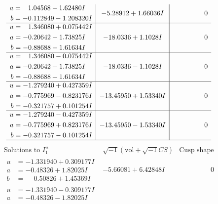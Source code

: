 \documentclass[1p]{elsarticle_modified}
\theoremstyle{definition}
\newcommand{\I}{\sqrt{-1}}
\begin{document}
$$\begin{array}{c|c|c}
\begin{aligned}
a &= \phantom{-}1.04568 - 1.62480 I \\
b &= -0.112849 - 1.208320 I\end{aligned}
 & -5.28912 + 1.66036 I & \phantom{-0.000000 } 0 \\ \hline\begin{aligned}
u &= \phantom{-}1.346080 + 0.075442 I \\
a &= -0.20642 - 1.73825 I \\
b &= -0.88688 - 1.61634 I\end{aligned}
 & -18.0336 + 1.1028 I & \phantom{-0.000000 } 0 \\ \hline\begin{aligned}
u &= \phantom{-}1.346080 - 0.075442 I \\
a &= -0.20642 + 1.73825 I \\
b &= -0.88688 + 1.61634 I\end{aligned}
 & -18.0336 - 1.1028 I & \phantom{-0.000000 } 0 \\ \hline\begin{aligned}
u &= -1.279240 + 0.427359 I \\
a &= -0.775969 - 0.823176 I \\
b &= -0.321757 + 0.101254 I\end{aligned}
 & -13.45950 + 1.53340 I & \phantom{-0.000000 } 0 \\ \hline\begin{aligned}
u &= -1.279240 - 0.427359 I \\
a &= -0.775969 + 0.823176 I \\
b &= -0.321757 - 0.101254 I\end{aligned}
 & -13.45950 - 1.53340 I & \phantom{-0.000000 } 0\\
 \hline 
 \end{array}$$\newpage$$\begin{array}{c|c|c}  
\text{Solutions to }I^u_{1}& \I (\text{vol} + \sqrt{-1}CS) & \text{Cusp shape}\\
 \hline 
\begin{aligned}
u &= -1.331940 + 0.309177 I \\
a &= -0.48326 + 1.82025 I \\
b &= \phantom{-}0.50826 + 1.45369 I\end{aligned}
 & -5.66081 + 6.42848 I & \phantom{-0.000000 } 0 \\ \hline\begin{aligned}
u &= -1.331940 - 0.309177 I \\
a &= -0.48326 - 1.82025 I \\

\end{aligned}
\end{array}$$
\end{document}
